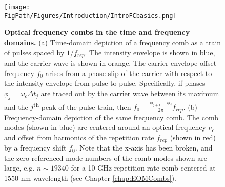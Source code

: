 \begin{figure}[htpb]
	\begin{center}
		\texttt{[image: \\FigPath/Figures/Introduction/IntroFCbasics.png]}
	\end{center}
	\caption[Optical frequency combs in the time and frequency domains]{\textbf{Optical frequency combs in the time and frequency domains.} (a) Time-domain depiction of a frequency comb as a train of pulses spaced by $1/f_{rep}$. The intensity envelope is shown in blue, and the carrier wave is shown in orange. The carrier-envelope offset frequency $f_0$ arises from a phase-slip of the carrier with respect to the intensity envelope from pulse to pulse. Specifically, if phases $\phi_j=\omega_c\Delta t_j$ are traced out by the carrier wave between its maximum and the $j$\textsuperscript{th} peak of the pulse train, then $f_0=\frac{\phi_{j+1}-\phi_j}{2\pi}f_{rep}$. (b) Frequency-domain depiction of the same frequency comb. The comb modes (shown in blue) are centered around an optical frequency $\nu_c$ and offset from harmonics of the repetition rate $f_{rep}$ (shown in red) by a frequency shift $f_0$. Note that the x-axis has been broken, and the zero-referenced mode numbers of the comb modes shown are large, e.g. $n\sim19340$ for a 10 GHz repetition-rate comb centered at 1550 nm wavelength (see Chapter \ref{chap:EOMCombs}). }
	\label{fig:CombBasics}
\end{figure} 



